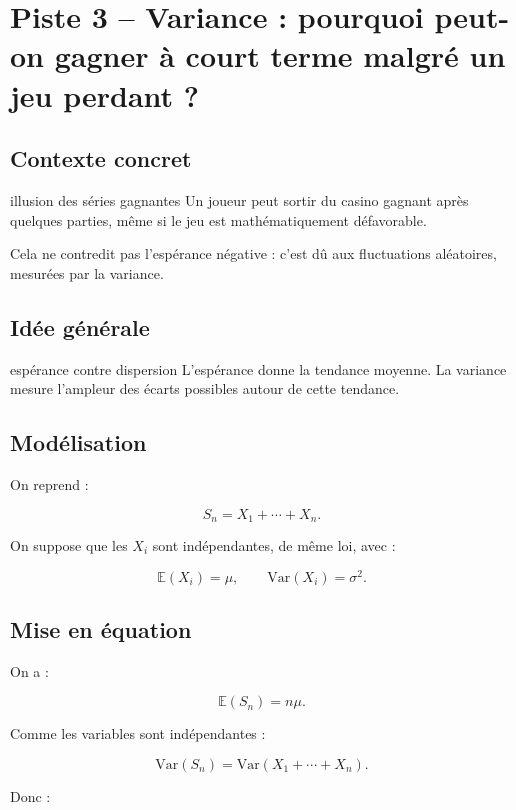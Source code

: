 \documentclass[11pt,a4paper]{article}
\newcommand{\E}{\mathbb{E}}
\newcommand{\V}{\mathrm{Var}}
\begin{document}
\section{Piste 3 -- Variance : pourquoi peut-on gagner à court terme malgré un jeu perdant ?}

\subsection{Contexte concret}

\begin{contexte}{illusion des séries gagnantes}
Un joueur peut sortir du casino gagnant après quelques parties, même si le jeu est mathématiquement défavorable.

Cela ne contredit pas l'espérance négative : c'est dû aux fluctuations aléatoires, mesurées par la variance.
\end{contexte}

\subsection{Idée générale}

\begin{idee}{espérance contre dispersion}
L'espérance donne la tendance moyenne. La variance mesure l'ampleur des écarts possibles autour de cette tendance.
\end{idee}

\subsection{Modélisation}

On reprend :

\[
S_n=X_1+\cdots+X_n.
\]

On suppose que les $X_i$ sont indépendantes, de même loi, avec :

\[
\E(X_i)=\mu,
\qquad
\V(X_i)=\sigma^2.
\]

\subsection{Mise en équation}

On a :

\[
\E(S_n)=n\mu.
\]

Comme les variables sont indépendantes :

\[
\V(S_n)=\V(X_1+\cdots+X_n).
\]

Donc :
\end{document}
